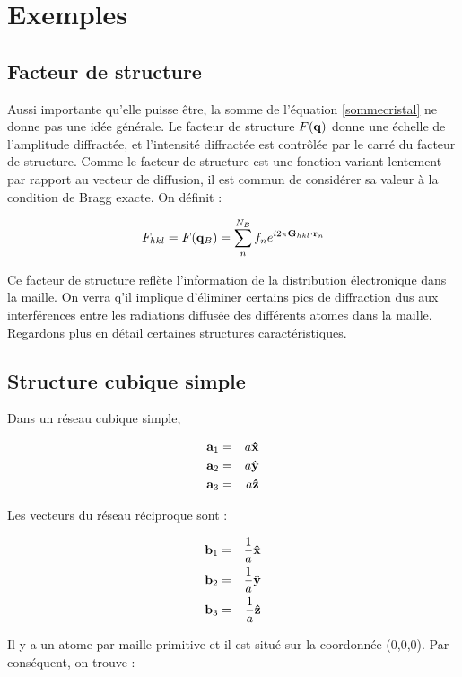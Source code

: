 \section{Exemples}

\subsection{Facteur de structure}

Aussi importante qu'elle puisse être, la somme de l'équation \ref{sommecristal}
ne donne pas une idée générale. Le facteur de structure $F(\mathbf{q})$ donne une
échelle de l'amplitude diffractée, et l'intensité diffractée est contrôlée
par le carré du facteur de structure. Comme le facteur de structure est une
fonction variant lentement par rapport au vecteur de diffusion, il est commun de
considérer sa valeur à la condition de Bragg exacte. On définit :

\begin{equation}
    F_{hkl} = F(\mathbf{q}_B) = \sum_n^{N_B} f_n e^{i2\pi \mathbf{G}_{hkl}\cdot\mathbf{r}_n}
\end{equation}

Ce facteur de structure reflète l'information de la distribution électronique
dans la maille. On verra q'il implique d'éliminer certains pics de diffraction
dus aux interférences entre les radiations diffusée des différents atomes dans
la maille.
Regardons plus en détail certaines structures caractéristiques.

\subsection{Structure cubique simple}

Dans un réseau cubique simple,

\begin{eqnarray}
    \mathbf{a}_1 & = & a \mathbf{\hat{x}} \\
    \mathbf{a}_2 & = & a \mathbf{\hat{y}} \\
    \mathbf{a}_3 & = & a \mathbf{\hat{z}}
\end{eqnarray}

Les vecteurs du réseau réciproque sont :

\begin{eqnarray}
    \mathbf{b}_1 & = & \frac{1}{a} \mathbf{\hat{x}} \\
    \mathbf{b}_2 & = & \frac{1}{a} \mathbf{\hat{y}} \\
    \mathbf{b}_3 & = & \frac{1}{a} \mathbf{\hat{z}}
\end{eqnarray}

Il y a un atome par maille primitive et il est situé sur la coordonnée (0,0,0).
Par conséquent, on trouve :

